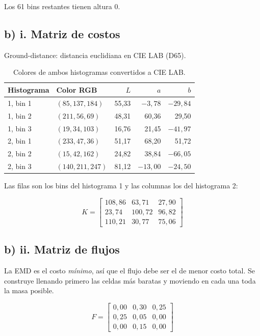 \documentclass[12pt, a4paper]{article}
\begin{document}
Los 61 bins restantes tienen altura 0.

\subsection{b) i. Matriz de costos}

Ground-distance: distancia euclidiana en CIE LAB (D65).

\begin{table}[H]
\centering
\caption{Colores de ambos histogramas convertidos a CIE LAB.}
\begin{tabular}{llrrr}
\toprule
\textbf{Histograma} & \textbf{Color RGB} & \textbf{$L$} & \textbf{$a$} & \textbf{$b$} \\
\midrule
1, bin 1 & $(85, 137, 184)$ & 55,33 & $-3{,}78$ & $-29{,}84$ \\
1, bin 2 & $(211, 56, 69)$ & 48,31 & 60,36 & 29,50 \\
1, bin 3 & $(19, 34, 103)$ & 16,76 & 21,45 & $-41{,}97$ \\
\midrule
2, bin 1 & $(233, 47, 36)$ & 51,17 & 68,20 & 51,72 \\
2, bin 2 & $(15, 42, 162)$ & 24,82 & 38,84 & $-66{,}05$ \\
2, bin 3 & $(140, 211, 247)$ & 81,12 & $-13{,}00$ & $-24{,}50$ \\
\bottomrule
\end{tabular}
\end{table}

Las filas son los bins del histograma 1 y las columnas los del histograma 2:

\[
K =
\begin{bmatrix}
108{,}86 & 63{,}71 & 27{,}90 \\
23{,}74 & 100{,}72 & 96{,}82 \\
110{,}21 & 30{,}77 & 75{,}06
\end{bmatrix}
\]

\subsection{b) ii. Matriz de flujos}

La EMD es el costo \emph{mínimo}, así que el flujo debe ser el de menor costo total. Se construye llenando primero las celdas más baratas y moviendo en cada una toda la masa posible.

\[
F =
\begin{bmatrix}
0{,}00 & 0{,}30 & 0{,}25 \\
0{,}25 & 0{,}05 & 0{,}00 \\
0{,}00 & 0{,}15 & 0{,}00
\end{bmatrix}
\]
\end{document}
